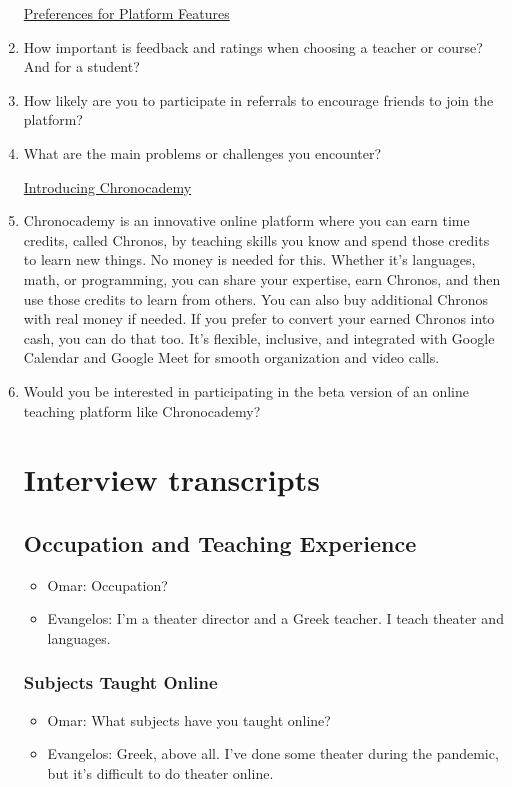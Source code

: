\begin{enumerate}
\underline{Preferences for Platform Features}
\item How important is feedback and ratings when choosing a teacher or course?
And for a student?
\item How likely are you to participate in referrals to encourage friends to join the platform?
\item What are the main problems or challenges you encounter?

\underline{Introducing Chronocademy}
\item Chronocademy is an innovative online platform where you can earn time credits, called Chronos, by teaching skills you know and spend those credits to learn new things.
No money is needed for this.
Whether it's languages, math, or programming, you can share your expertise, earn Chronos, and then use those credits to learn from others.
You can also buy additional Chronos with real money if needed.
If you prefer to convert your earned Chronos into cash, you can do that too.
It's flexible, inclusive, and integrated with Google Calendar and Google Meet for smooth organization and video calls.

\item Would you be interested in participating in the beta version of an online teaching platform like Chronocademy?

\section{Interview transcripts}\label{sec:interview-transcripts}

\subsection*{Occupation and Teaching Experience}
\begin{itemize}
\item Omar: Occupation?
\item Evangelos: I'm a theater director and a Greek teacher.
I teach theater and languages.
\end{itemize}

\subsubsection*{Subjects Taught Online}
\begin{itemize}
\item Omar: What subjects have you taught online?
\item Evangelos: Greek, above all.
I’ve done some theater during the pandemic, but it’s difficult to do theater online.
\end{itemize}


\end{enumerate}
